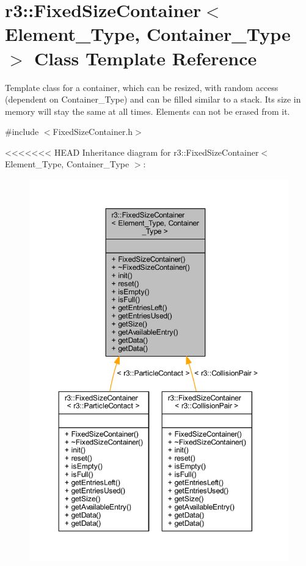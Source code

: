 \hypertarget{classr3_1_1_fixed_size_container}{}\section{r3\+:\+:Fixed\+Size\+Container$<$ Element\+\_\+\+Type, Container\+\_\+\+Type $>$ Class Template Reference}
\label{classr3_1_1_fixed_size_container}


Template class for a container, which can be resized, with random access (dependent on Container\+\_\+\+Type) and can be filled similar to a stack. Its size in memory will stay the same at all times. Elements can not be erased from it.  




{\ttfamily \#include $<$Fixed\+Size\+Container.\+h$>$}



<<<<<<< HEAD
Inheritance diagram for r3\+:\+:Fixed\+Size\+Container$<$ Element\+\_\+\+Type, Container\+\_\+\+Type $>$\+:\nopagebreak
\begin{figure}[H]
\begin{center}
\leavevmode
\includegraphics[width=350pt]{classr3_1_1_fixed_size_container__inherit__graph}
\end{center}
\end{figure}


